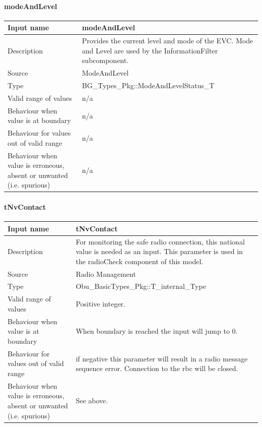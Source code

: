 \paragraph{modeAndLevel}

\begin{longtable}{p{}p{}}
\toprule
Input name				& modeAndLevel \\
\midrule
Description				& Provides the current level and mode of the EVC. Mode and Level are used by the InformationFilter subcomponent.\\
\midrule
Source					& ModeAndLevel \\ 
\midrule
Type					& BG\_Types\_Pkg::ModeAndLevelStatus\_T \\
\midrule
Valid range of values	& n/a\\
\midrule
Behaviour when value is at boundary	& n/a\\
\midrule
Behaviour for values out of valid range	& n/a\\
\midrule
Behaviour when value is erroneous, absent or unwanted (i.e. spurious) & n/a\\
\bottomrule
\end{longtable}


\paragraph{tNvContact}

\begin{longtable}{p{}p{}}
\toprule
Input name				& tNvContact \\
\midrule
Description				& For monitoring the safe radio connection, this national value is needed as an input. This parameter is used in the radioCheck component of this model. \\
\midrule
Source					& Radio Management\\ 
\midrule
Type					& Obu\_BasicTypes\_Pkg::T\_internal\_Type \\
\midrule
Valid range of values	& Positive integer. \\
\midrule
Behaviour when value is at boundary	& When boundary is reached the input will jump to 0.\\
\midrule
Behaviour for values out of valid range	& if negative this parameter will result in a radio message sequence error. Connection to the rbc will be closed.\\
\midrule
Behaviour when value is erroneous, absent or unwanted (i.e. spurious) & See above.\\
\bottomrule
\end{longtable}


